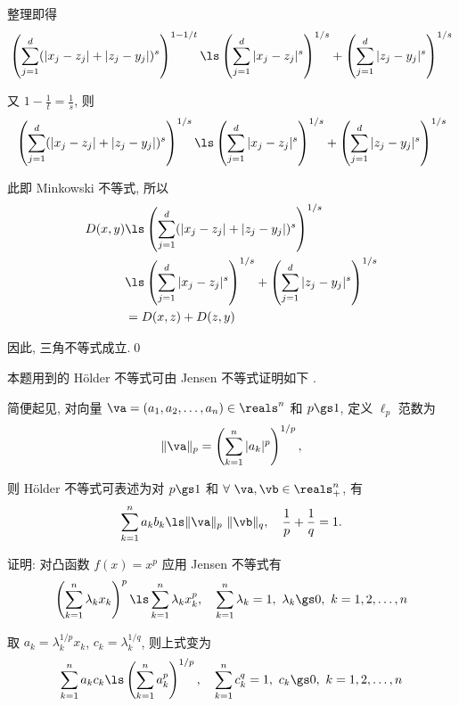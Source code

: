 \documentclass[openany]{ctexbook}
\theoremstyle{kaiti}
\theoremstyle{normal}
\begin{document}
整理即得
\begin{equation}
    \left(\sum_{j=1}^d(|x_j-z_j|+|z_j-y_j|)^s\right)^{1-1/t}
    \ls\left(\sum_{j=1}^d|x_j-z_j|^s\right)^{1/s}+\left(\sum_{j=1}^d|z_j-y_j|^s\right)^{1/s}
\end{equation}

又 $1-\frac{1}{t}=\frac{1}{s}$, 则
\begin{equation}
  \left(\sum_{j=1}^d(|x_j-z_j|+|z_j-y_j|)^s\right)^{1/s}
  \ls\left(\sum_{j=1}^d|x_j-z_j|^s\right)^{1/s}+\left(\sum_{j=1}^d|z_j-y_j|^s\right)^{1/s}
\end{equation}

此即 Minkowski 不等式, 所以
\begin{equation}
  \begin{aligned}
    D(x,y)
    &\ls\left(\sum_{j=1}^d(|x_j-z_j|+|z_j-y_j|)^s\right)^{1/s}\\
    &\ls\left(\sum_{j=1}^d|x_j-z_j|^s\right)^{1/s}+\left(\sum_{j=1}^d|z_j-y_j|^s\right)^{1/s}\\
    &=D(x,z)+D(z,y)
  \end{aligned}
\end{equation}

因此, 三角不等式成立.\qed

本题用到的 H{\"o}lder 不等式可由 Jensen 不等式证明如下 \cite{Holder_inequality}.

简便起见, 对向量 $\va=(a_1,a_2,\dots,a_n)\in\reals^n$ 和 $p\gs1$, 定义 $\ell_p$ 范数为
\begin{equation}
  \|\va\|_p=\left(\sum_{k=1}^n|a_k|^p\right)^{1/p},
\end{equation}

则 H{\"o}lder 不等式可表述为对 $p\gs1$ 和 $\forall~\va,\vb\in\reals_+^n$, 有
\begin{equation}
  \sum_{k=1}^na_kb_k\ls\|\va\|_p~\|\vb\|_q,\quad\frac{1}{p}+\frac{1}{q}=1.
\end{equation}

证明: 对凸函数 $f(x)=x^p$ 应用 Jensen 不等式有
\begin{equation}
  \left(\sum_{k=1}^n\lambda_kx_k\right)^p\ls\sum_{k=1}^n\lambda_kx_k^p,\quad\sum_{k=1}^n\lambda_k=1,~\lambda_k\gs0,~k=1,2,\dots,n
\end{equation}

取 $a_k=\lambda_k^{1/p}x_k$, $c_k=\lambda_k^{1/q}$, 则上式变为
\begin{equation}
  \sum_{k=1}^na_kc_k\ls\left(\sum_{k=1}^na_k^p\right)^{1/p},\quad\sum_{k=1}^nc_k^q=1,~c_k\gs0,~k=1,2,\dots,n
\end{equation}
\end{document}
